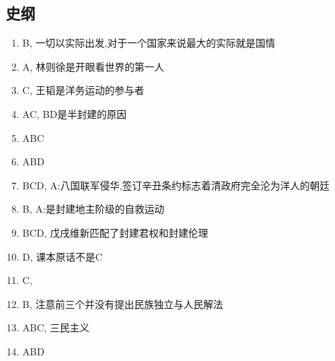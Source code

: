 \documentclass[12pt, a4paper, oneside, UTF8]{ctexbook}
\begin{document}
\subsection{史纲}
\begin{enumerate}
    \item B, 一切以实际出发,对于一个国家来说最大的实际就是国情
    \item A, 林则徐是开眼看世界的第一人
    \item C, 王韬是洋务运动的参与者
    \item AC, BD是半封建的原因
    \item ABC
    \item ABD
    \item BCD, A:八国联军侵华,签订辛丑条约标志着清政府完全沦为洋人的朝廷
    \item B, A:是封建地主阶级的自救运动
    \item BCD, 戊戌维新匹配了封建君权和封建伦理
    \item D, 课本原话不是C
    \item C,
    \item B, 注意前三个并没有提出民族独立与人民解法
    \item ABC, 三民主义
    \item ABD
\end{enumerate}
\ifx\allfiles\undefined
\end{document}
